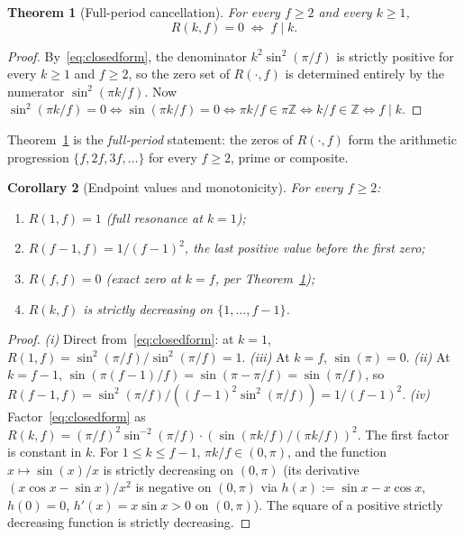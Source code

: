 \documentclass[11pt,reqno]{amsart}
\theoremstyle{plain}
\newtheorem{theorem}{Theorem}[section]
\newtheorem{corollary}[theorem]{Corollary}
\theoremstyle{definition}
\theoremstyle{remark}
\newcommand{\Z}{\mathbb{Z}}
\begin{document}
\begin{theorem}[Full-period cancellation]\label{thm:fullperiod}
For every $f \ge 2$ and every $k \ge 1$,
\[
  R(k, f) = 0 \;\Longleftrightarrow\; f \mid k.
\]
\end{theorem}

\begin{proof}
By~\eqref{eq:closedform}, the denominator $k^{2} \sin^{2}(\pi/f)$ is
strictly positive for every $k \ge 1$ and $f \ge 2$, so the zero set
of $R(\cdot, f)$ is determined entirely by the numerator
$\sin^{2}(\pi k/f)$. Now $\sin^{2}(\pi k/f) = 0 \Leftrightarrow
\sin(\pi k/f) = 0 \Leftrightarrow \pi k/f \in \pi \Z \Leftrightarrow
k/f \in \Z \Leftrightarrow f \mid k$.
\end{proof}

Theorem~\ref{thm:fullperiod} is the \emph{full-period} statement: the
zeros of $R(\cdot, f)$ form the arithmetic progression
$\{f, 2f, 3f, \dots\}$ for every $f \ge 2$, prime or composite.

\begin{corollary}[Endpoint values and monotonicity]\label{cor:endpoints}
For every $f \ge 2$:
\begin{enumerate}[label={\upshape(\roman*)}]
\item $R(1, f) = 1$ (full resonance at $k = 1$);
\item $R(f - 1, f) = 1/(f - 1)^{2}$, the last positive value before
      the first zero;
\item $R(f, f) = 0$ (exact zero at $k = f$, per
      Theorem~\ref{thm:fullperiod});
\item $R(k, f)$ is strictly decreasing on $\{1, \dots, f - 1\}$.
\end{enumerate}
\end{corollary}

\begin{proof}
\emph{(i)} Direct from~\eqref{eq:closedform}: at $k = 1$,
$R(1, f) = \sin^{2}(\pi/f) / \sin^{2}(\pi/f) = 1$.
\emph{(iii)} At $k = f$, $\sin(\pi) = 0$.
\emph{(ii)} At $k = f - 1$, $\sin(\pi(f-1)/f) = \sin(\pi - \pi/f)
= \sin(\pi/f)$, so $R(f-1, f) = \sin^{2}(\pi/f) / ((f-1)^{2}
\sin^{2}(\pi/f)) = 1/(f-1)^{2}$.
\emph{(iv)} Factor~\eqref{eq:closedform} as
$R(k, f) = (\pi/f)^{2} \sin^{-2}(\pi/f) \cdot (\sin(\pi k/f)/(\pi k/f))^{2}$.
The first factor is constant in $k$. For $1 \le k \le f - 1$,
$\pi k/f \in (0, \pi)$, and the function $x \mapsto \sin(x)/x$ is
strictly decreasing on $(0, \pi)$ (its derivative
$(x \cos x - \sin x)/x^{2}$ is negative on $(0, \pi)$ via
$h(x) := \sin x - x \cos x$, $h(0) = 0$, $h'(x) = x \sin x > 0$ on
$(0, \pi)$). The square of a positive strictly decreasing function
is strictly decreasing.
\end{proof}
\end{document}
